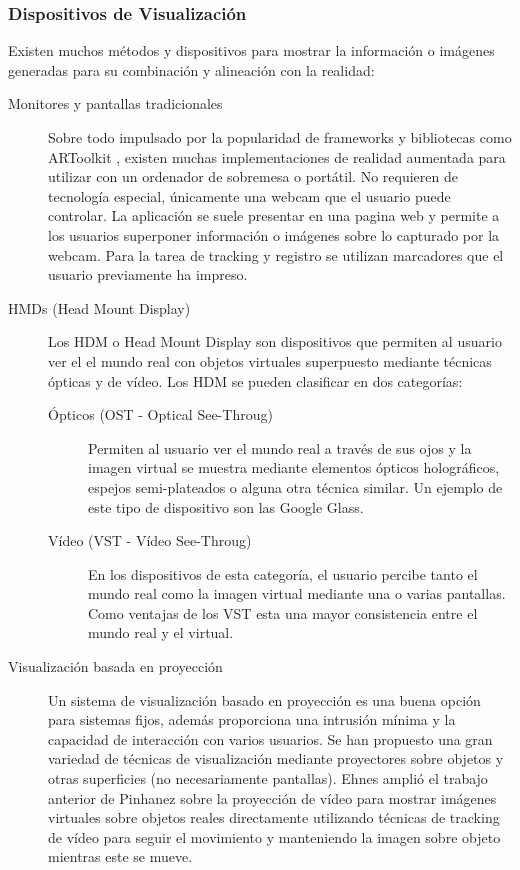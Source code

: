 \subsubsection{Dispositivos  de Visualización}
Existen  muchos métodos y dispositivos para mostrar la información o imágenes generadas para su combinación y alineación con la realidad: 
\begin{description}
\item[Monitores y pantallas tradicionales]
  Sobre todo impulsado por la popularidad de frameworks y bibliotecas como ARToolkit \cite{Kato}, existen muchas implementaciones de realidad aumentada para utilizar con un ordenador de sobremesa o portátil. No requieren de tecnología especial, únicamente una webcam que el usuario puede controlar. La aplicación se suele presentar en una pagina web y permite a los usuarios superponer información o imágenes sobre lo capturado por la webcam. Para la tarea de tracking y registro se utilizan marcadores que el usuario previamente ha impreso.
  
\item[HMDs (Head Mount Display)] Los HDM o Head Mount Display son dispositivos que permiten al usuario ver el el mundo real con objetos virtuales superpuesto mediante técnicas ópticas y de vídeo. Los HDM se pueden clasificar en dos categorías:
  \begin{description}
  \item[Ópticos (OST - Optical See-Throug)] Permiten al usuario ver el mundo real a través de sus ojos y la imagen virtual se muestra mediante elementos ópticos holográficos, espejos semi-plateados o alguna otra técnica similar. Un ejemplo de este tipo de dispositivo son las Google Glass.
    
  \item[Vídeo (VST - Vídeo See-Throug)] En los dispositivos de esta categoría, el usuario percibe tanto el mundo real como la imagen virtual mediante una o varias pantallas. Como ventajas de los VST esta una mayor consistencia entre el mundo real y el virtual.
  \end{description}
  
\item[Visualización basada en proyección]
  Un sistema de visualización basado en proyección es una buena opción para sistemas fijos, además proporciona una intrusión mínima y la capacidad de interacción con varios usuarios.
  Se han propuesto una gran variedad de técnicas de visualización mediante proyectores sobre objetos y otras superficies (no necesariamente pantallas). Ehnes \cite{Ehnes} amplió el trabajo anterior de Pinhanez \cite{Pinhanez} sobre la proyección de vídeo para mostrar imágenes virtuales sobre objetos reales directamente utilizando técnicas de tracking de vídeo para seguir el movimiento y manteniendo la imagen sobre objeto mientras este se mueve.
  

\end{description}
